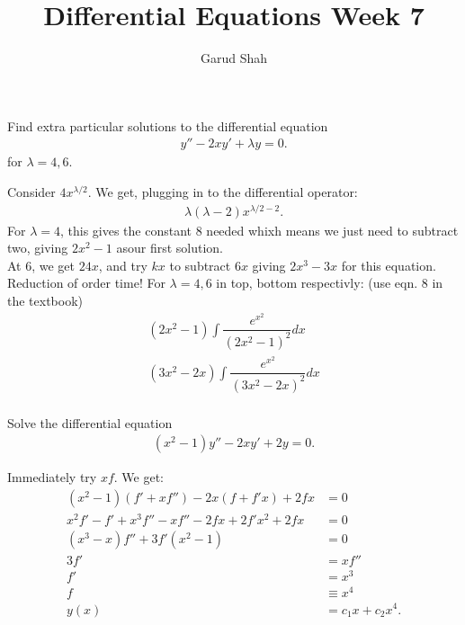 \documentclass[11pt]{article}
\title{Differential Equations Week \textbf{7}}
\author{Garud Shah}
\begin{document}
    \maketitle \newpage 
    \begin{problem}
        \setcounter{equation}{-1}
        Find extra particular solutions to the differential equation 
        \begin{align}
            y'' - 2xy' + \lambda y = 0.
        \end{align}
        for $\lambda=4,6$.
    \end{problem}
    \begin{solution}
        Consider $4x^{\lambda/2}$. We get, plugging in to the differential operator:
        \begin{align}
            \lambda\left(\lambda - 2\right)x^{\lambda/2 - 2}.
        \end{align}
        For $\lambda = 4$, this gives the constant $8$ needed whixh means we just need to subtract two, giving $2x^2-1$ asour first solution. \\
        At $6$, we get $24x$, and try $kx$ to subtract $6x$ giving $2x^3 - 3x$ for this equation. \\
        Reduction of order time! For $\lambda = 4,6$ in top, bottom respectivly: (use eqn. 8 in the textbook)
        \begin{align}
            \boxed{(2x^2 - 1) \int \dfrac{e^{x^2}}{(2x^2-1)^2}dx} \\
            \boxed{(3x^2 - 2x) \int \dfrac{e^{x^2}}{(3x^2-2x)^2}dx} \\
        \end{align}  
    \end{solution}
    \newpage
    \begin{problem}[Problem 2]
        Solve the differential equation 
        \begin{align}
            (x^2-1)y'' -2xy' + 2y = 0.
        \end{align}
    \end{problem}
    \begin{solution}
        Immediately try $xf$. We get:
        \begin{align}
            (x^2-1)(f' + xf'') - 2x(f+f'x) + 2fx &= 0 \\
            x^2f' - f' + x^3f'' - xf'' - 2fx + 2f'x^2 + 2fx &= 0 \\
            (x^3-x)f'' + 3f'(x^2-1) &= 0 \\
            3f' &= xf'' \\
            f' &= x^3 \\
            f &\equiv x^4 \\
            y(x) &= c_1x+c_2x^4.
        \end{align}
    \end{solution}
\end{document}
